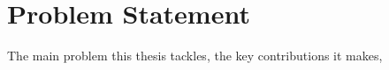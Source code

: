 \chapter{Problem Statement}

The main problem this thesis tackles, the key contributions it makes, \etc{}

